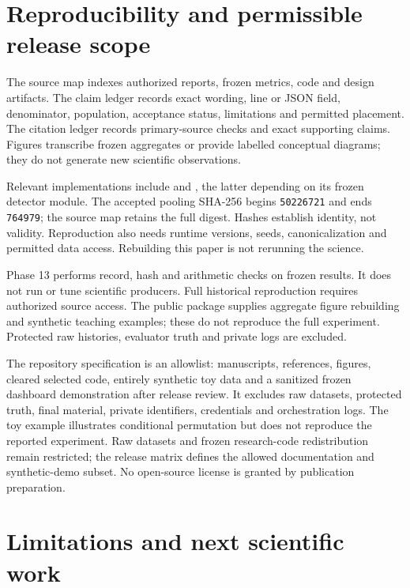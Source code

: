 \documentclass[11pt,letterpaper]{article}
\begin{document}
\section{Reproducibility and permissible release scope}
The source map indexes authorized reports, frozen metrics, code and design artifacts. The claim ledger records exact wording, line or JSON field, denominator, population, acceptance status, limitations and permitted placement. The citation ledger records primary-source checks and exact supporting claims. Figures transcribe frozen aggregates or provide labelled conceptual diagrams; they do not generate new scientific observations.

\begin{samepage}
Relevant implementations include  and , the latter depending on its frozen detector module. The accepted pooling SHA-256 begins \texttt{50226721} and ends \texttt{764979}; the source map retains the full digest. Hashes establish identity, not validity. Reproduction also needs runtime versions, seeds, canonicalization and permitted data access. Rebuilding this paper is not rerunning the science.
\par\end{samepage}

Phase 13 performs record, hash and arithmetic checks on frozen results. It does not run or tune scientific producers. Full historical reproduction requires authorized source access. The public package supplies aggregate figure rebuilding and synthetic teaching examples; these do not reproduce the full experiment. Protected raw histories, evaluator truth and private logs are excluded.

The repository specification is an allowlist: manuscripts, references, figures, cleared selected code, entirely synthetic toy data and a sanitized frozen dashboard demonstration after release review. It excludes raw datasets, protected truth, final material, private identifiers, credentials and orchestration logs. The toy example illustrates conditional permutation but does not reproduce the reported experiment. Raw datasets and frozen research-code redistribution remain restricted; the release matrix defines the allowed documentation and synthetic-demo subset. No open-source license is granted by publication preparation.

\section{Limitations and next scientific work}
\end{document}
